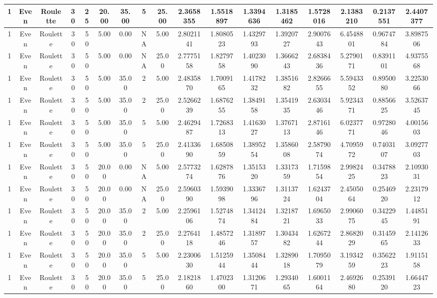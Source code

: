 \begin{longtable}{ | c | c | c | c | c | c | c | c | c | c | c | c | c | c | c | c | c | }
	\hline
	1	&	Even	&	Roulette	&	30	&	25	&	20.00	&	35.00	&	5	&	25.00	&	2.3658355	&	1.5518897	&	1.3394636	&	1.3185462	&	1.5728016	&	2.1383210	&	0.2137551	&	2.4407377 \\
	\hline
	1	&	Even	&	Roulette	&	30	&	50	&	5.00	&	0.00	&	NA	&	5.00	&	2.8021141	&	1.8080523	&	1.4329793	&	1.3920727	&	2.9007643	&	6.4548801	&	0.9674784	&	3.8987506 \\
	\hline
	1	&	Even	&	Roulette	&	30	&	50	&	5.00	&	0.00	&	NA	&	25.00	&	2.7775158	&	1.8279758	&	1.4023090	&	1.3666243	&	2.6838436	&	5.2790171	&	0.8391101	&	4.9375568 \\
	\hline
	1	&	Even	&	Roulette	&	30	&	50	&	5.00	&	35.00	&	2	&	5.00	&	2.4835870	&	1.7009165	&	1.4178232	&	1.3851682	&	2.8266655	&	5.5943352	&	0.8950080	&	3.2253066 \\
	\hline
	1	&	Even	&	Roulette	&	30	&	50	&	5.00	&	35.00	&	2	&	25.00	&	2.5266239	&	1.6876255	&	1.3849158	&	1.3541935	&	2.6303446	&	5.9234371	&	0.8856625	&	3.5263745 \\
	\hline
	1	&	Even	&	Roulette	&	30	&	50	&	5.00	&	35.00	&	5	&	5.00	&	2.4629487	&	1.7268313	&	1.4163027	&	1.3767113	&	2.8716146	&	6.0237771	&	0.9728046	&	4.0015603 \\
	\hline
	1	&	Even	&	Roulette	&	30	&	50	&	5.00	&	35.00	&	5	&	25.00	&	2.4133690	&	1.6850859	&	1.3895254	&	1.3586008	&	2.5879074	&	4.7095972	&	0.7403107	&	3.0927703 \\
	\hline
	1	&	Even	&	Roulette	&	30	&	50	&	20.00	&	0.00	&	NA	&	5.00	&	2.5773274	&	1.6287876	&	1.3515320	&	1.3317359	&	1.7159854	&	2.9982425	&	0.3478823	&	2.1093031 \\
	\hline
	1	&	Even	&	Roulette	&	30	&	50	&	20.00	&	0.00	&	NA	&	25.00	&	2.5960390	&	1.5939098	&	1.3336796	&	1.3113724	&	1.6243704	&	2.4505064	&	0.2546920	&	2.2317912 \\
	\hline
	1	&	Even	&	Roulette	&	30	&	50	&	20.00	&	35.00	&	2	&	5.00	&	2.2596106	&	1.5274874	&	1.3412484	&	1.3218721	&	1.6965033	&	2.9906075	&	0.3422945	&	1.4485191 \\
	\hline
	1	&	Even	&	Roulette	&	30	&	50	&	20.00	&	35.00	&	2	&	25.00	&	2.2764118	&	1.4857246	&	1.3189757	&	1.3043482	&	1.6267244	&	2.8682029	&	0.3145965	&	2.1412633 \\
	\hline
	1	&	Even	&	Roulette	&	30	&	50	&	20.00	&	35.00	&	5	&	5.00	&	2.2300630	&	1.5125944	&	1.3508444	&	1.3289018	&	1.7095079	&	3.1934259	&	0.3562223	&	1.9115158 \\
	\hline
	1	&	Even	&	Roulette	&	30	&	50	&	20.00	&	35.00	&	5	&	25.00	&	2.1821860	&	1.4702300	&	1.3120671	&	1.2934065	&	1.6001164	&	2.4692680	&	0.2539120	&	1.6644723 \\

\end{longtable}
